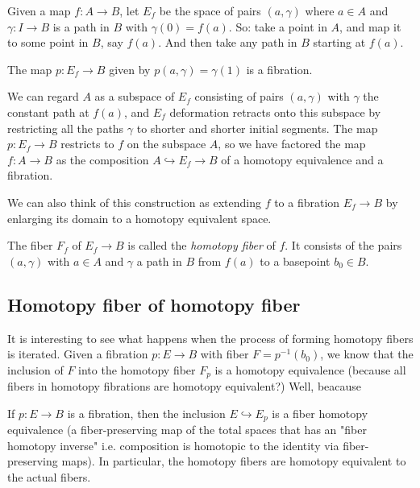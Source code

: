\begin{definition}
\begin{definition}
	Given a map $f:A\to B$, let $E_f$ be the space of pairs $(a,\gamma)$ where $a\in A$ and $\gamma:I\to B$ is a path in $B$ with $\gamma(0)=f(a)$. {\color{blue}So: take a point in $A$, and map it to some point in $B$, say $f(a)$. And then take any path in $B$ starting at $f (a)$.}
\begin{proposition}
	The map $p:E_f\to B$ given by $p(a,\gamma)=\gamma(1)$ is a fibration.
\end{proposition}
We can regard $A$ as a subspace of $E_{f}$ consisting of pairs $(a,\gamma)$ with $\gamma$ the constant path at $f(a)$, and $E_f$ deformation retracts onto this subspace by restricting all the paths $\gamma$ to shorter and shorter initial segments. The map $p:E_f\to B$ restricts to $f$ on the subspace $A$, so we have factored the map $f:A\to B$ as the composition $A\hookrightarrow E_f\to B$ of a homotopy equivalence and a fibration.

We can also think of this construction as extending $f$ to a fibration $E_f\to B$ by enlarging its domain to a homotopy equivalent space.

The fiber $F_f$ of $E_f\to B$ is called the {\it homotopy fiber} of $f$. It consists of the pairs $(a,\gamma)$ with $a\in A$ and $\gamma$ a path in $B$ from $f(a)$ to a basepoint $b_0\in B$.
\end{definition}

\subsection{Homotopy fiber of homotopy fiber}

It is interesting to see what happens when the process of forming homotopy fibers is iterated. Given a fibration $p:E\to B$ with fiber $F=p^{-1} (b_0)$, we know that the inclusion of $F$ into the homotopy fiber $F_{p}$ is a homotopy equivalence {\color{blue}(because all fibers in homotopy fibrations are homotopy equivalent?)} Well, beacause
\begin{proposition}[4.66]
	If $p:E\to B$ is a fibration, then the inclusion $E\hookrightarrow E_p$ is a fiber homotopy equivalence (a fiber-preserving map of the total spaces that has an "fiber homotopy inverse" i.e. composition is homotopic to the identity via fiber-preserving maps). In particular, the homotopy fibers are homotopy equivalent to the actual fibers.
\end{proposition}


\end{definition}
